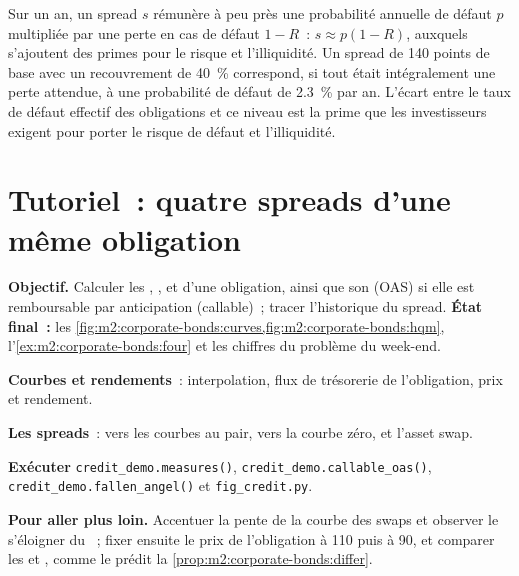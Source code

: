 \begin{remark}\label{rem:m2:corporate-bonds:loss}
Sur un an, un spread $s$ rémunère à peu près une probabilité annuelle de défaut $p$ multipliée par une
perte en cas de défaut $1 - R$~: $s \approx p(1 - R)$, auxquels s'ajoutent des primes pour le risque et
l'illiquidité. Un spread de 140 points de base avec un recouvrement de 40~\% correspond, si tout
était intégralement une perte attendue, à une probabilité de défaut de 2.3~\% par an. L'écart
entre le taux de défaut effectif des obligations et ce niveau est la prime que les investisseurs exigent pour
porter le risque de défaut et l'illiquidité.
\end{remark}

\section{Tutoriel~: quatre spreads d'une même obligation}\label{tut:m2:corporate-bonds:spreads}

\begin{tutorial}
\textbf{Objectif.} Calculer les , ,  et  d'une obligation, ainsi que son
 (OAS) si elle est remboursable par anticipation (callable)~; tracer l'historique du spread.
\textbf{État final~:}
les \cref{fig:m2:corporate-bonds:curves,fig:m2:corporate-bonds:hqm},
l'\cref{ex:m2:corporate-bonds:four} et les chiffres du problème du week-end.
\begin{tutsteps}
\item \textbf{Courbes et rendements}~: interpolation, flux de trésorerie de l'obligation, prix et
rendement.
\label{lst:m2:corporate-bonds:yield}
\item \textbf{Les spreads}~: vers les courbes au pair, vers la courbe zéro, et l'asset swap.
\label{lst:m2:corporate-bonds:spreads}
\item \textbf{Exécuter} \texttt{credit\_demo.measures()},
\texttt{credit\_demo.callable\_oas()}, \texttt{credit\_demo.fallen\_angel()} et
\texttt{fig\_credit.py}.
\end{tutsteps}
\textbf{Pour aller plus loin.} Accentuer la pente de la courbe des swaps et observer le 
s'éloigner du ~; fixer ensuite le prix de l'obligation à 110 puis à 90, et comparer les
 et , comme le prédit la \cref{prop:m2:corporate-bonds:differ}.
\end{tutorial}

